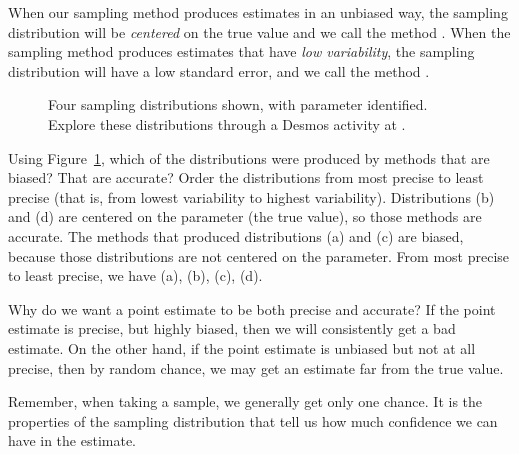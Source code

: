 When our sampling method produces estimates in an unbiased way, the sampling distribution will be \emph{centered} on the true value and we call the method .  When the sampling method  produces estimates that have \emph{low variability}, the sampling distribution will have a low standard error, and we call the method .

\begin{figure}[h]
   \centering
{}
   \caption{Four sampling distributions shown, with parameter identified. Explore these distributions through a Desmos activity at .}
   \label{fourSamplingDistributions}
\end{figure}

\begin{examplewrap}
\begin{nexample}
{Using Figure~\ref{fourSamplingDistributions}, which of the distributions were produced by methods that are biased?  That are accurate?  Order the distributions from most precise to least precise (that is, from lowest variability to highest variability).}
Distributions (b) and (d) are centered on the parameter (the true value), so those methods are accurate.  The methods that produced distributions (a) and (c) are biased, because those distributions are not centered on the parameter.  From most precise to least precise, we have (a), (b), (c), (d).
\end{nexample}
\end{examplewrap}

\begin{examplewrap}
\begin{nexample}
{Why do we want a point estimate to be both precise and accurate?} If the point estimate is precise, but highly biased, then we will consistently get a bad estimate.  On the other hand, if the point estimate is unbiased but not at all precise, then by random chance, we may get an estimate far from the true value.  

Remember, when taking a sample, we generally get only one chance.  It is the properties of the sampling distribution that tell us how much confidence we can have in the estimate. \end{nexample}
\end{examplewrap}

